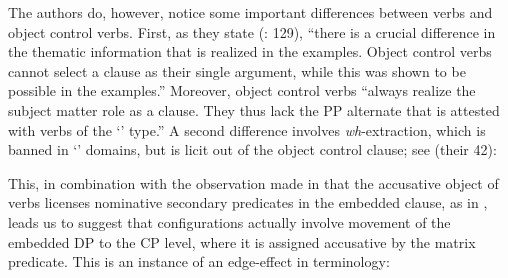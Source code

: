 \documentclass[output=paper]{langsci/langscibook}
\begin{document}
    \z

The authors do, however, notice some important differences between  verbs and object control verbs. First, as they state (\citealt{Kotzoglou2007}: 129), “there is a crucial difference in the thematic information that is realized in the  examples. Object control verbs cannot select a clause as their single argument, while this was shown to be possible in the  examples.” Moreover, object control verbs “always realize the subject matter role as a clause. They thus lack the PP alternate that is attested with verbs of the ‘’ type.” A second difference involves \textit{wh}-extraction, which is banned in  ‘’ domains, but is licit out of the object control clause; see  (their 42):

\ea%
    \label{ex:alexiadou:43}
    \z
\z

This, in combination with the observation made in \citet{Kotzoglou2007} that the accusative object of  verbs licenses nominative secondary predicates in the embedded clause, as in , leads us to suggest that  configurations actually involve movement of the embedded DP to the CP level, where it is assigned accusative by the matrix predicate. This is an instance of an edge-effect in  terminology:
\end{document}
